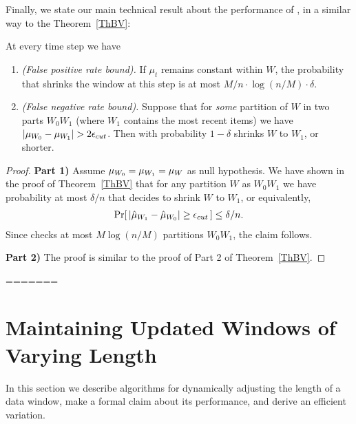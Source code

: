 Finally, we state our main technical result about the performance of \adwintwoz, in a similar way to the Theorem~\ref{ThBV}:

\begin{theorem}
\label{ThBV2}
At every time step we have 

\begin{enumerate}
\item {\em (False positive rate bound).} If $\mu_t$ remains constant within $W$, 
the probability that \adwintwo shrinks the window 
at this step is at most $ M/n  \cdot \log (n/M) \cdot \delta$.

\item {\em (False negative rate bound).} 
Suppose that for {\em some} partition of $W$ in two parts $W_0W_1$ 
(where $W_1$ contains the most recent items) 
we have $|\mu_{W_0}-\mu_{W_1}| > 2\epsilon_{cut}$. 
Then with probability $1-\delta$ \adwintwo
shrinks $W$ to $W_1$, or shorter.
\end{enumerate}
\end{theorem}

\begin{proof}

{\bf{Part 1)}}
Assume ${\mu}_{W_0}={\mu}_{W_1}=\mu_W$ as null hypothesis. We have shown in the proof of Theorem~\ref{ThBV} that for any partition
$W$ as $W_0W_1$ we have probability at most $\delta/n$ that \adwinz
decides to shrink $W$ to $W_1$, or equivalently,
\begin{eqnarray*}
\Pr [\, |\hat{\mu}_{W_1} - \hat{\mu}_{W_0}| \ge  \epsilon_{cut}\, ] \le \delta/n.
\end{eqnarray*}
%
Since \adwintwo checks at most  $M \log (n/M)$ partitions $W_0 W_1$, the claim follows.

{\bf{Part 2)}}
The proof is similar to the proof of Part 2 of Theorem~\ref{ThBV}.
\end{proof}
=======
%

\section{Maintaining Updated Windows of Varying Length}
\label{SMain}
In %
this section we describe algorithms 
for dynamically adjusting the length
of a data window, make a formal claim about its performance, and 
derive an efficient variation.

